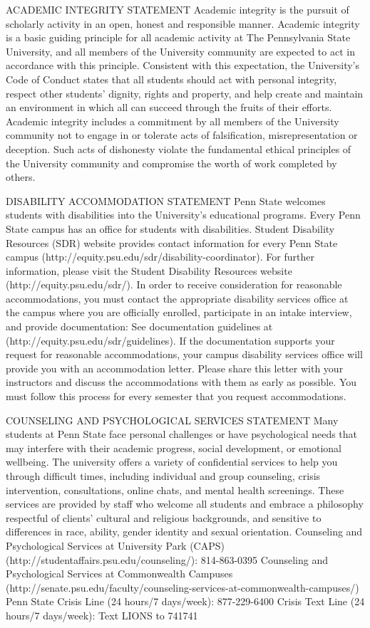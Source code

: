 \vspace{-.1in}\documentclass[11pt]{article}
\begin{document}
ACADEMIC INTEGRITY STATEMENT
Academic integrity is the pursuit of scholarly activity in an open, honest and responsible manner. Academic integrity is a basic guiding principle for all academic activity at The Pennsylvania State University, and all members of the University community are expected to act in accordance with this principle. Consistent with this expectation, the University’s Code of Conduct states that all students should act with personal integrity, respect other students’ dignity, rights and property, and help create and maintain an environment in which all can succeed through the fruits of their efforts.
Academic integrity includes a commitment by all members of the University community not to engage in or tolerate acts of falsification, misrepresentation or deception. Such acts of dishonesty violate the fundamental ethical principles of the University community and compromise the worth of work completed by others.

DISABILITY ACCOMMODATION STATEMENT
Penn State welcomes students with disabilities into the University’s educational programs. Every Penn State campus has an office for students with disabilities. Student Disability Resources (SDR) website provides contact information for every Penn State campus (http://equity.psu.edu/sdr/disability-coordinator). For further information, please visit the Student Disability Resources website (http://equity.psu.edu/sdr/).
In order to receive consideration for reasonable accommodations, you must contact the appropriate disability services office at the campus where you are officially enrolled, participate in an intake interview, and provide documentation: See documentation guidelines at (http://equity.psu.edu/sdr/guidelines). If the documentation supports your request for reasonable accommodations, your campus disability services office will provide you with an accommodation letter. Please share this letter with your instructors and discuss the accommodations with them as early as possible. You must follow this process for every semester that you request accommodations.

COUNSELING AND PSYCHOLOGICAL SERVICES STATEMENT
Many students at Penn State face personal challenges or have psychological needs that may interfere with their academic progress, social development, or emotional wellbeing. The university offers a variety of confidential services to help you through difficult times, including individual and group counseling, crisis intervention, consultations, online chats, and mental health screenings. These services are provided by staff who welcome all students and embrace a philosophy respectful of clients’ cultural and religious backgrounds, and sensitive to differences in race, ability, gender identity and sexual orientation.
Counseling and Psychological Services at University Park  (CAPS)
(http://studentaffairs.psu.edu/counseling/): 814-863-0395
Counseling and Psychological Services at Commonwealth Campuses
(http://senate.psu.edu/faculty/counseling-services-at-commonwealth-campuses/)
Penn State Crisis Line (24 hours/7 days/week): 877-229-6400
Crisis Text Line (24 hours/7 days/week): Text LIONS to 741741
\end{document}
